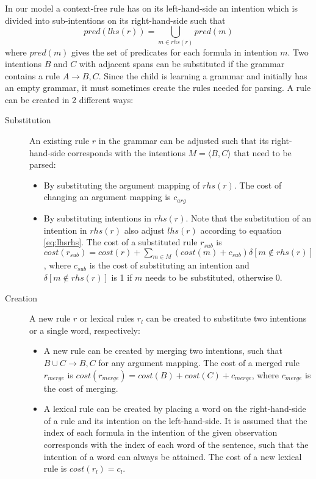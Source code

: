 \documentclass[a4paper]{article}
\begin{document}
In our model a context-free rule has on its left-hand-side an intention which is divided into sub-intentions on its right-hand-side such that 
\begin{equation}
pred(lhs(r)) =  \bigcup_{m \in rhs(r)} pred(m)
\label{eq:lhsrhs}
\end{equation}
where $pred(m)$ gives the set of predicates for each formula in intention $m$.  Two intentions $B$ and $C$ with adjacent spans can be substituted if the grammar contains a rule $A \rightarrow B, C$. Since the child is learning a grammar and initially has an empty grammar, it must sometimes create the rules needed for parsing. A rule can be created in 2 different ways:
\begin{description}
\item[Substitution] An existing rule $r$ in the grammar can be adjusted such that its right-hand-side corresponds with the intentions $M = \langle B, C \rangle$ that need to be parsed:
  \begin{itemize}
  \item By substituting the argument mapping of $rhs(r)$. The cost of changing an argument mapping is $c_{arg}$
  \item By substituting intentions in $rhs(r)$. Note that the substitution of an intention in $rhs(r)$ also adjust $lhs(r)$ according to equation \ref{eq:lhsrhs}. The cost of a substituted rule $r_{sub}$ is $cost(r_{sub}) = cost(r) + \sum_{m \in M} (cost(m) + c_{sub}) \delta[m \notin rhs(r) ]$, where $c_{sub}$ is the cost of substituting an intention and $\delta[m \notin rhs(r) ]$ is 1 if $m$ needs to be substituted, otherwise 0.
  \end{itemize}
\item[Creation] A new rule $r$ or lexical rules $r_l$ can be created to substitute two intentions or a single word, respectively:
  \begin{itemize}
  \item A new rule can be created by merging two intentions, such that $B\cup C \rightarrow B, C$ for any argument mapping. The cost of a merged rule $r_{merge}$ is $cost(r_{merge}) = cost(B) + cost(C) + c_{merge}$, where $c_{merge}$ is the cost of merging. 
  \item A lexical rule can be created by placing a word on the right-hand-side of a rule and its intention on the left-hand-side. It is assumed that the index of each formula in the intention of the given observation corresponds with the index of each word of the sentence, such that the intention of a word can always be attained. The cost of a new lexical rule is $cost(r_l) = c_l$.
  \end{itemize}
\end{description}
\end{document}
